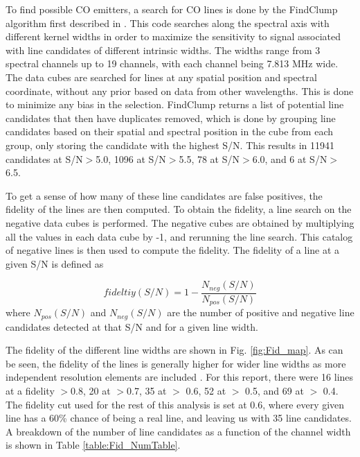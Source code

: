 To find possible CO emitters, a search for CO lines is done by the FindClump algorithm first described in \cite{walter2016alma}. This code searches along the spectral axis with different kernel widths in order to maximize the sensitivity to signal associated with line candidates of different intrinsic widths. The widths range from 3 spectral channels up to 19 channels, with each channel being 7.813 MHz wide. The data cubes are searched for lines at any spatial position and spectral coordinate, without any prior based on data from other wavelengths. This is done to minimize any bias in the selection. FindClump returns a list of potential line candidates that then have duplicates removed, which is done by grouping line candidates based on their spatial and spectral position in the cube from each group, only storing the candidate with the highest S/N. This results in 11941 candidates at S/N$>$5.0, 1096 at S/N$>$5.5, 78 at S/N$>$6.0, and 6 at S/N$>$6.5. 

To get a sense of how many of these line candidates are false positives, the fidelity of the lines are then computed. To obtain the fidelity, a line search on the negative data cubes is performed. The negative cubes are obtained by multiplying all the values in each data cube by -1, and rerunning the line search. This catalog of negative lines is then used to compute the fidelity. The fidelity of a line at a given S/N is defined as 

$$ fideltiy(S/N) = 1 - \frac{N_{neg}(S/N)}{N_{pos}(S/N)} $$ where $N_{pos}(S/N)$ and $N_{neg}(S/N)$ are the number of positive and negative line candidates detected at that S/N and for a given line width\cite{gonzalez2019alma}.

The fidelity of the different line widths are shown in Fig. \ref{fig:Fid_map}. As can be seen, the fidelity of the lines is generally higher for wider line widths as more independent resolution elements are included \cite{decarli2019alma}. For this report, there were 16 lines at a fidelity $>$0.8, 20 at $>$0.7, 35 at $>$ 0.6, 52 at $>$ 0.5, and 69 at $>$ 0.4. The fidelity cut used for the rest of this analysis is set at 0.6, where every given line has a 60\% chance of being a real line, and leaving us with 35 line candidates. A breakdown of the number of line candidates as a function of the channel width is shown in Table \ref{table:Fid_NumTable}. 

